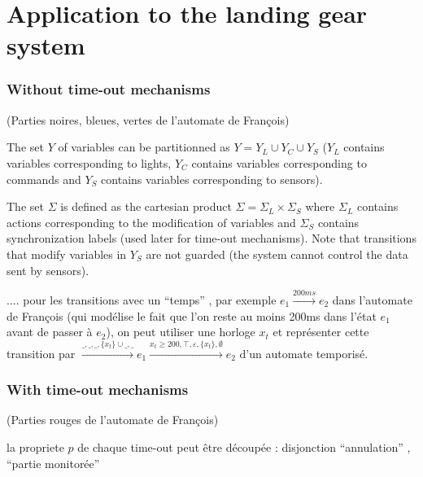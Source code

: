 \documentclass[a4paper,10pt]{article}
\begin{document}
\section{Application to the landing gear system}

\subsubsection*{Without time-out mechanisms}

(Parties noires, bleues, vertes de l'automate de Fran\c{c}ois)


The set $Y$ of variables can be partitionned as $Y = Y_L \cup Y_C \cup
Y_S$ ($Y_L$ contains variables corresponding to lights, $Y_C$ contains
variables corresponding to commands and $Y_S$ contains
variables corresponding to sensors).

The set $\Sigma$ is defined as the cartesian product $\Sigma = \Sigma_L
\times \Sigma_S$ where $\Sigma_L$ contains actions corresponding to
the modification of variables and $\Sigma_S$ contains synchronization
labels (used later for time-out mechanisms). Note that transitions
that modify variables in $Y_S$ are not guarded (the system cannot
control the data sent by sensors).


.... pour les
transitions avec un ``temps'' , par exemple $e_1 \xrightarrow{200ms}
e_2$ dans l'automate de Fran\c{c}ois (qui mod\'elise le fait que
l'on reste au moins 200ms dans l'\'etat $e_1$ avant de passer \`a
$e_2$), on peut utiliser une horloge $x_t$ et repr\'esenter cette
transition par
$\xrightarrow{\_,\_,\_,\{ x_t \} \cup \_,\_} e_1 \xrightarrow{x_t \geq 200 , \top , \varepsilon , \{ x_t \},\emptyset} e_2$
d'un automate temporis\'e.

\subsubsection*{With time-out mechanisms}

(Parties rouges de l'automate de Fran\c{c}ois)

la propriete $p$ de chaque time-out peut \^etre d\'ecoup\'ee :
disjonction   ``annulation'' , ``partie monitor\'ee''




\end{document}

